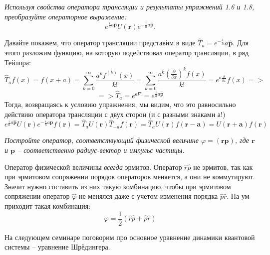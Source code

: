 \begin{center}
\textit{Используя свойства оператора трансляции и результаты упражнений 1.6 и 1.8, преобразуйте операторное выражение:}
\[
e^{\frac{i}{\hbar}a\hat{\mathbf{p}}}U(\mathbf{r})e^{-\frac{i}{\hbar}a\hat{\mathbf{p}}}.
\]
\end{center}
Давайте покажем, что оператор трансляции представ$\acute{\text{и}}$м в виде $\hat T_a = e^{-\frac{i}{h}}a\hat{\mathbf{p}}$. Для этого разложим функцию, на которую подействовал оператор трансляции, в ряд Тейлора:
\[
\hat T_{a} f(x) = f(x+a) = \sum\limits_{k=0}^{\infty} \frac{a^k f^{(k)}(x)}{k!} = \sum\limits_{k=0}^{\infty} \frac{a^k (\frac{\partial}{\partial x})^k f(x)}{k!} = e^{a\frac{\partial}{\partial x}}f(x) =>
\]
\[
=> \hat T_{a} = e^{a\nabla} = e^{\frac{i}{h}a\hat{\mathbf{p}}}
\]
Тогда, возвращаясь к условию упражнения, мы видим, что это равносильно действию оператора трансляции с двух сторон (и с разными знаками а!)
\[
e^{\frac{i}{\hbar}a\hat{\mathbf{p}}}U(\mathbf{r})e^{-\frac{i}{\hbar}a\hat{\mathbf{p}}} f(\mathbf{r}) = \hat T_{a}U(\mathbf{r})\hat T_{-a} f(\mathbf{r}) = \hat T_{a}U(\mathbf{r})f(\mathbf{r-a}) = U(\mathbf{r+a})f(\mathbf{r})
\]
\begin{center}
\textit{Постройте оператор, соответствующий физической величине $\varphi = (\mathbf{rp})$, где $\mathbf r$ и $\mathbf p$ -- соответственно радиус-вектор и импульс частицы.}
\end{center}
Оператор физической величины \textit{всегда} эрмитов. Оператор $\hat{r}\hat{p}$ не эрмитов, так как при эрмитовом сопряжении порядок операторов меняется, а они не коммутируют. Значит нужно составить из них такую комбинацию, чтобы при эрмитовом сопряжении оператор $\hat \varphi$ не менялся даже с учетом изменения порядка $\hat p \hat r$. На ум приходит такая комбинация:
\[
\hat \varphi = \frac{1}{2}(\hat r \hat p + \hat p \hat r)
\]

На следующем семинаре поговорим про основное уравнение динамики квантовой системы -- уравнение Шрёдингера.